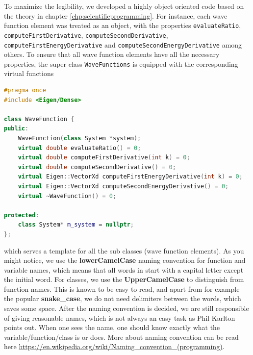 To maximize the legibility, we developed a highly object oriented code based on the theory in chapter \eqref{chp:scientificprogramming}. For instance, each wave function element was treated as an object, with the properties \texttt{evaluateRatio}, \texttt{computeFirstDerivative}, \texttt{computeSecondDerivative}, \texttt{computeFirstEnergyDerivative} and \texttt{computeSecondEnergyDerivative} among others. To ensure that all wave function elements have all the necessary properties, the super class \texttt{WaveFunctions} is equipped with the corresponding virtual functions
\lstset{basicstyle=\scriptsize}
\begin{lstlisting}[language=c++,caption={Simplification of \texttt{wavefunction.h}}]
#pragma once
#include <Eigen/Dense>

class WaveFunction {
public:
	WaveFunction(class System *system);
	virtual double evaluateRatio() = 0;
	virtual double computeFirstDerivative(int k) = 0;
	virtual double computeSecondDerivative() = 0;
	virtual Eigen::VectorXd computeFirstEnergyDerivative(int k) = 0;
	virtual Eigen::VectorXd computeSecondEnergyDerivative() = 0;
	virtual ~WaveFunction() = 0;

protected:
	class System* m_system = nullptr;
};
\end{lstlisting}
which serves a template for all the sub classes (wave function elements). As you might notice, we use the \textbf{lowerCamelCase} naming convention for function and variable names, which means that all words in start with a capital letter except the initial word. For classes, we use the \textbf{UpperCamelCase} to distinguish from function names. This is known to be easy to read, and apart from for example the popular \textbf{snake\_case}, we do not need delimiters between the words, which saves some space. After the naming convention is decided, we are still responsible of giving reasonable names, which is not always an easy task as Phil Karlton points out. When one sees the name, one should know exactly what the variable/function/class is or does. More about naming convention can be read here \url{https://en.wikipedia.org/wiki/Naming_convention_(programming)}.

